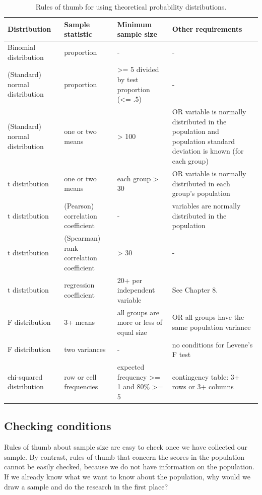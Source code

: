 \documentclass[a4paper]{book}
\theoremstyle{definition}
\theoremstyle{definition}
\theoremstyle{definition}
\theoremstyle{remark}
\begin{document}
\begin{table}

\caption{\label{tab:thumb}Rules of thumb for using theoretical probability distributions.}
\centering
\fontsize{8}{8}\selectfont
\begin{tabular}[t]{p{2.5cm}p{2.5cm}p{3.5cm}p{3.5cm}}
\hline
Distribution & Sample statistic & Minimum sample size & Other requirements\\
\hline
Binomial distribution & proportion & - & -\\
(Standard) normal distribution & proportion & >= 5 divided by test proportion (<= .5) & -\\
(Standard) normal distribution & one or two means & > 100 & OR variable is normally distributed in the population and population standard deviation is known (for each group)\\
t distribution & one or two means & each group > 30 & OR variable is normally distributed in each group's population\\
t distribution & (Pearson) correlation coefficient & - & variables are normally distributed in the population\\
t distribution & (Spearman) rank correlation coefficient & > 30 & -\\
t distribution & regression coefficient & 20+ per independent variable & See Chapter 8.\\
F distribution & 3+ means & all groups are more or less of equal size & OR all groups have the same population variance\\
F distribution & two variances & - & no conditions for Levene's F test\\
chi-squared distribution & row or cell frequencies & expected frequency >= 1 and 80\% >= 5 & contingency table: 3+ rows or 3+ columns\\
\hline
\end{tabular}
\end{table}

\subsection{Checking conditions}\label{checking-conditions}

Rules of thumb about sample size are easy to check once we have
collected our sample. By contrast, rules of thumb that concern the
scores in the population cannot be easily checked, because we do not
have information on the population. If we already know what we want to
know about the population, why would we draw a sample and do the
research in the first place?
\end{document}
